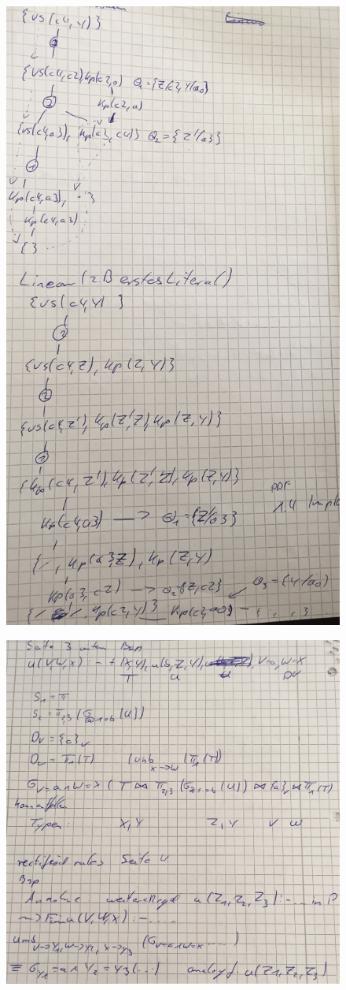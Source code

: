 \documentclass[12pt, a4paper]{article}
\begin{document}
\begin{itemize}
\begin{figure}[h!]
\centering
\includegraphics[width=0.7\linewidth]{img/img10}
\caption{}
\label{fig:img10}
\end{figure}
\begin{figure}[h!]
\centering
\includegraphics[width=0.7\linewidth]{img/img11}
\caption{}
\label{fig:img11}
\end{figure}
\end{itemize}
\end{document}
